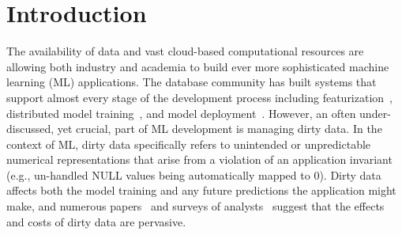 \section{Introduction}\label{intro}
The availability of data and vast cloud-based computational resources are allowing both industry and academia to build ever more sophisticated machine learning (ML) applications.
The database community has built systems that support almost every stage of the development process including featurization~\cite{keystone,zhang2014mat}, distributed model training~\cite{hellerstein2012madlib, crotty2014tupleware, feng2012toward, tensor}, and model deployment~\cite{crankshawmissing}.  
However, an often under-discussed, yet crucial, part of ML development is managing dirty data.
In the context of ML, dirty data specifically refers to unintended or unpredictable numerical representations that arise from a violation of an application invariant (e.g., un-handled NULL values being automatically mapped to 0).
Dirty data affects both the model training and any future predictions the application might make, and numerous papers~\cite{sculley2014machine} and surveys of analysts~\cite{kandel2012, krishnan2016hilda} suggest that the effects and costs of dirty data are pervasive.

